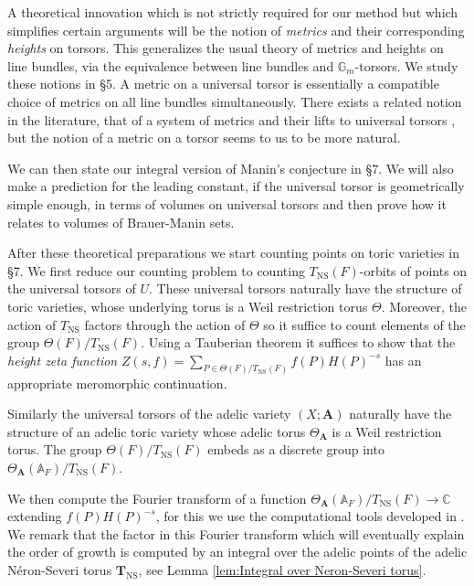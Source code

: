 \documentclass[a4paper,11pt,reqno]{amsart}
\newcommand{\C}{\mathbb{C}}
\newcommand{\G}{\mathbb{G}}
\newcommand{\A}{\mathbb{A}}
\DeclareMathOperator{\NS}{NS}
\theoremstyle{definition}
\begin{document}
A theoretical innovation which is not strictly required for our method but which simplifies certain arguments will be the notion of \emph{metrics} and their corresponding \emph{heights} on torsors. This generalizes the usual theory of metrics and heights on line bundles, via the equivalence between line bundles and $\G_m$-torsors. We study these notions in \S5. A metric on a universal torsor is essentially a compatible choice of metrics on all line bundles simultaneously. There exists a related notion in the literature, that of a system of metrics and their lifts to universal torsors \cite[\S4]{Peyre1998Terme}, but the notion of a metric on a torsor seems to us to be more natural.

We can then state our integral version of Manin's conjecture in \S7. We will also make a prediction for the leading constant, if the universal torsor is geometrically simple enough, in terms of volumes on universal torsors and then prove how it relates to volumes of Brauer-Manin sets.

After these theoretical preparations we start counting points on toric varieties in \S7. We first reduce our counting problem to counting $T_{\NS}(F)$-orbits of points on the universal torsors of $U$. These universal torsors naturally have the structure of toric varieties, whose underlying torus is a Weil restriction torus $\Theta$. Moreover, the action of $T_{\NS}$ factors through the action of $\Theta$ so it suffice to count elements of the group $\Theta(F)/T_{\NS}(F)$. Using a Tauberian theorem it suffices to show that the \emph{height zeta function} $Z(s, f) = \sum_{P \in \Theta(F)/T_{\NS}(F)} f(P) H(P)^{-s}$ has an appropriate meromorphic continuation.

Similarly the universal torsors of the adelic variety $(X ; \mathbf{A})$ naturally have the structure of an adelic toric variety whose adelic torus $\Theta_{\mathbf{A}}$ is a Weil restriction torus. The group $\Theta(F)/T_{\NS}(F)$ embeds as a discrete group into $\Theta_{\mathbf{A}}(\A_F)/T_{\NS}(F)$. 

We then compute the Fourier transform of a function $\Theta_{\mathbf{A}}(\A_F)/T_{\NS}(F) \to \C$ extending $f(P) H(P)^{-s}$, for this we use the computational tools developed in \cite{Chambert-Loir2010Igusa}. We remark that the factor in this Fourier transform which will eventually explain the order of growth is computed by an integral over the adelic points of the adelic N\'eron-Severi torus $\mathbf{T}_{\NS}$, see Lemma \ref{lem:Integral over Neron-Severi torus}.
\end{document}
